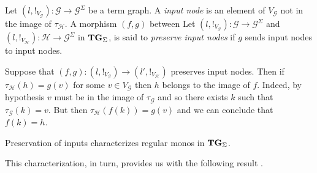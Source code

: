 \documentclass[a4paper,UKenglish,cleveref,pdftex,thm-restate,numberwithinsect]{lipics-v2021}
\newcommand{\catname}[1]{\textbf{\textup{#1}}}
\newcommand{\hyp}{\catname{Hyp}}
\newcommand{\tg}[0]{\catname{TG}_{\Sigma}}
\begin{document}
\begin{definition}
	Let $(l, !_{V_{\mathcal{G}}})\colon \mathcal{G}\to \mathcal{G}^{\Sigma}$  be a term graph. A \emph{input node} is an element of $V_{\mathcal{G}}$ not in the image of $\tau_{\mathcal{H}}$.  A morphism $(f,g)$ between
	Let $(l, !_{V_{\mathcal{G}}})\colon \mathcal{G}\to \mathcal{G}^{\Sigma}$ and $(l, !_{V_{\mathcal{H}}})\colon \mathcal{H}\to \mathcal{G}^{\Sigma}$ in $\tg$, is said to \emph{preserve input nodes} if $g$ sends input nodes to input nodes.
\end{definition}

\begin{remark}\label{prop:image}
	Suppose that $(f,g)\colon (l, !_{V_{\mathcal{G}}})\to (l', !_{V_{\mathcal{H}}})$ preserves input nodes. Then  if $\tau_{\mathcal{H}}(h)=g(v)$ for some $v\in V_{\mathcal{G}}$ then $h$ belongs to the image of $f$. Indeed, by hypothesis $v$ must be in the image of $\tau_{\mathcal{G}}$ and so there exists $k$ such that $\tau_{\mathcal{G}}(k)=v$. But then $\tau_{\mathcal{H}}(f(k))=g(v)$ and we can conclude that $f(k)=h$.
\end{remark}

Preservation of inputs characterizes regular monos in $\tg$.


This characterization, in turn, provides us with the following result \cite{CastelnovoGM24,castelnovo2023thesis}. 

\end{document}

